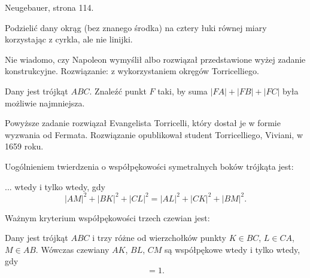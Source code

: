 \begin{proposition}
	Neugebauer, strona 114.
\end{proposition}

\color{red}

\begin{problem}
	Podzielić dany okrąg (bez znanego środka) na cztery łuki równej miary korzystając z cyrkla, ale nie linijki.
\end{problem}

Nie wiadomo, czy Napoleon wymyślił albo rozwiązał przedstawione wyżej zadanie konstrukcyjne.
Rozwiązanie: \cite[s. 116]{neugebauer} z wykorzystaniem okręgów Torricelliego.
%

\begin{problem}
	Dany jest trójkąt $ABC$.
	Znaleźć punkt $F$ taki, by suma $|FA| + |FB| + |FC|$ była możliwie najmniejsza.
\end{problem}

Powyższe zadanie rozwiązał Evangelista Torricelli, który dostał je w formie wyzwania od Fermata.
Rozwiązanie opublikował student Torricelliego, Viviani, w 1659 roku.


\color{black}

Uogólnieniem twierdzenia o współpękowości symetralnych boków trójkąta jest:

\begin{proposition}
	... wtedy i tylko wtedy, gdy
	\begin{equation}
		|AM|^2 + |BK|^2 + |CL|^2 = |AL|^2 + |CK|^2 + |BM|^2.
	\end{equation}
\end{proposition}

Ważnym kryterium współpękowości trzech czewian jest:

\begin{proposition}
	Dany jest trójkąt $ABC$ i trzy różne od wierzchołków punkty $K \in BC$, $L \in CA$, $M \in AB$.
	Wówczas czewiany $AK$, $BL$, $CM$ są współpękowe wtedy i tylko wtedy, gdy
	\begin{equation}
		[AMB] [BKC] [CLA] = 1.
	\end{equation}
\end{proposition}

